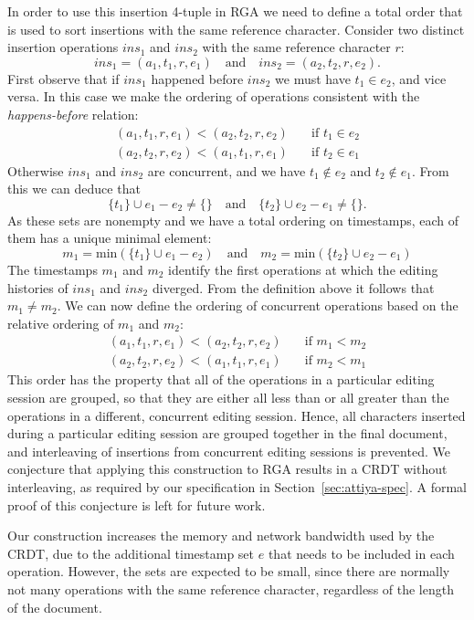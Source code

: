 \documentclass[sigconf]{acmart}
\begin{document}
In order to use this insertion 4-tuple in RGA we need to define a total order that is used to sort insertions with the same reference character.
Consider two distinct insertion operations $\mathit{ins}_1$ and $\mathit{ins}_2$ with the same reference character $r$:
\[ \mathit{ins}_1 = (a_1, t_1, r, e_1) \quad\text{and}\quad \mathit{ins}_2 = (a_2, t_2, r, e_2). \]
First observe that if $\mathit{ins}_1$ happened before $\mathit{ins}_2$ we must have $t_1 \in e_2$, and vice versa.
In this case we make the ordering of operations consistent with the \emph{happens-before} relation:
\begin{align*}
(a_1, t_1, r, e_1) < (a_2, t_2, r, e_2) &\quad\text{if } t_1 \in e_2 \\
(a_2, t_2, r, e_2) < (a_1, t_1, r, e_1) &\quad\text{if } t_2 \in e_1
\end{align*}
Otherwise $\mathit{ins}_1$ and $\mathit{ins}_2$ are concurrent, and we have $t_1 \notin e_2$ and $t_2 \notin e_1$.
From this we can deduce that
\[ \{t_1\} \cup e_1 - e_2 \ne \{\} \quad\text{and}\quad \{t_2\} \cup e_2 - e_1 \ne \{\}. \]
As these sets are nonempty and we have a total ordering on timestamps, each of them has a unique minimal element:
\[ m_1 = \mathrm{min}(\{t_1\} \cup e_1 - e_2) \quad\text{and}\quad m_2 = \mathrm{min}(\{t_2\} \cup e_2 - e_1) \]
The timestamps $m_1$ and $m_2$ identify the first operations at which the editing histories of $\mathit{ins}_1$ and $\mathit{ins}_2$ diverged.
From the definition above it follows that $m_1 \ne m_2$.
We can now define the ordering of concurrent operations based on the relative ordering of $m_1$ and $m_2$:
\begin{align*}
(a_1, t_1, r, e_1) < (a_2, t_2, r, e_2) &\quad\text{if } m_1 < m_2 \\
(a_2, t_2, r, e_2) < (a_1, t_1, r, e_1) &\quad\text{if } m_2 < m_1
\end{align*}
This order has the property that all of the operations in a particular editing session are grouped, so that they are either all less than or all greater than the operations in a different, concurrent editing session.
Hence, all characters inserted during a particular editing session are grouped together in the final document, and interleaving of insertions from concurrent editing sessions is prevented.
We conjecture that applying this construction to RGA results in a CRDT without interleaving, as required by our specification in Section~\ref{sec:attiya-spec}.
A formal proof of this conjecture is left for future work.

Our construction increases the memory and network bandwidth used by the CRDT, due to the additional timestamp set $e$ that needs to be included in each operation.
However, the sets are expected to be small, since there are normally not many operations with the same reference character, regardless of the length of the document.
\end{document}
